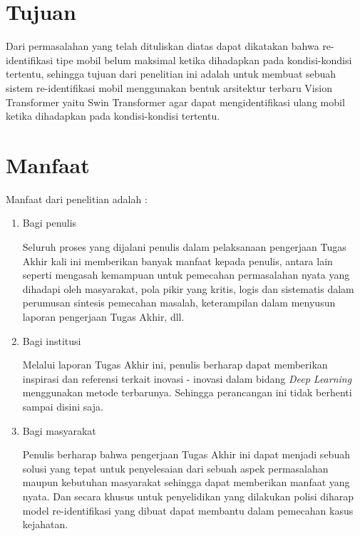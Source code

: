 \section{Tujuan}
\label{sec:Tujuan}

Dari permasalahan yang telah dituliskan diatas dapat dikatakan bahwa re-identifikasi tipe mobil belum maksimal
ketika dihadapkan pada kondisi-kondisi tertentu, sehingga tujuan dari penelitian ini adalah untuk membuat
sebuah sistem re-identifikasi mobil menggunakan bentuk arsitektur terbaru Vision Transformer yaitu 
Swin Transformer agar dapat mengidentifikasi ulang mobil ketika dihadapkan pada kondisi-kondisi tertentu.


\section{Manfaat}
\label{sec:manfaat}

Manfaat dari penelitian adalah :

\begin{enumerate}[nolistsep]
  
  \item Bagi penulis
  
  Seluruh proses yang dijalani penulis dalam pelaksanaan pengerjaan Tugas Akhir
  kali ini memberikan banyak manfaat kepada penulis, antara lain seperti mengasah
  kemampuan untuk pemecahan permasalahan nyata yang dihadapi oleh masyarakat,
  pola pikir yang kritis, logis dan sistematis dalam perumusan sintesis pemecahan
  masalah, keterampilan dalam menyusun laporan pengerjaan Tugas Akhir, dll.
  \item Bagi institusi
  
  Melalui laporan Tugas Akhir ini, penulis berharap dapat memberikan inspirasi dan
  referensi terkait inovasi - inovasi dalam bidang \emph{Deep Learning} menggunakan 
  metode terbarunya. Sehingga perancangan ini tidak berhenti sampai disini saja.
  \item Bagi masyarakat
  
  Penulis berharap bahwa pengerjaan Tugas Akhir ini dapat menjadi sebuah solusi yang 
  tepat untuk penyelesaian dari sebuah aspek permasalahan
  maupun kebutuhan masyarakat sehingga dapat memberikan manfaat yang nyata.
  Dan secara khusus untuk penyelidikan yang dilakukan polisi diharap model re-identifikasi yang dibuat
  dapat membantu dalam pemecahan kasus kejahatan.
  
\end{enumerate}

